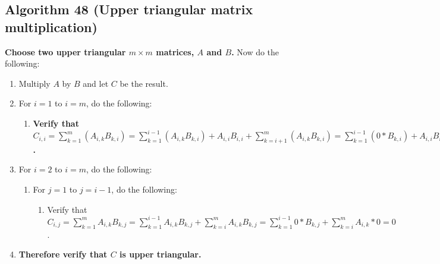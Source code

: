 \documentclass[twocolumn]{article}
\begin{document}
		\subsection{Algorithm 48 (Upper triangular matrix multiplication)}\label{sec:algorithm 48}
			\textbf{Choose two upper triangular $m\times m$ matrices, $A$ and $B$.} Now do the following:
			\begin{enumerate}
				\item Multiply $A$ by $B$ and let $C$ be the result.
				\item For $i=1$ to $i=m$, do the following:
				\begin{enumerate}
					\item \textbf{Verify that $C_{i,i}=\sum_{k=1}^m (A_{i,k}B_{k,i})=\sum_{k=1}^{i-1} (A_{i,k}B_{k,i})+A_{i,i}B_{i,i}+\sum_{k=i+1}^m (A_{i,k}B_{k,i})=\sum_{k=1}^{i-1} (0*B_{k,i})+A_{i,i}B_{i,i}+\sum_{k=i+1}^m (A_{i,k}*0)=A_{i,i}B_{i,i}$.}
				\end{enumerate}
				\item For $i=2$ to $i=m$, do the following:
				\begin{enumerate}
					\item For $j=1$ to $j=i-1$, do the following:
					\begin{enumerate}
						\item Verify that $C_{i,j}=\sum_{k=1}^m A_{i,k}B_{k,j}=\sum_{k=1}^{i-1} A_{i,k}B_{k,j}+\sum_{k=i}^m A_{i,k}B_{k,j}=\sum_{k=1}^{i-1} 0*B_{k,j}+\sum_{k=i}^m A_{i,k}*0=0$.
					\end{enumerate}
				\end{enumerate}
				\item \textbf{Therefore verify that $C$ is upper triangular.}
			\end{enumerate}
\end{document}
